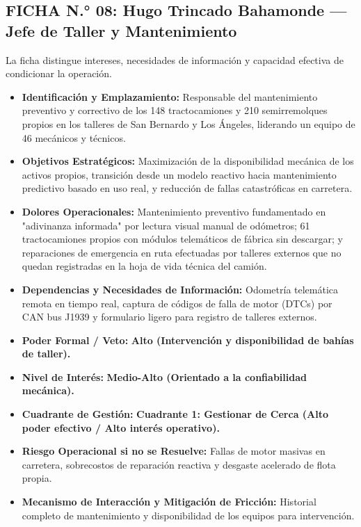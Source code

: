 \subsection*{FICHA N.° 08: Hugo Trincado Bahamonde — Jefe de Taller y Mantenimiento}
La ficha distingue intereses, necesidades de información y capacidad efectiva de condicionar la operación.
\begin{itemize}
\item \textbf{Identificación y Emplazamiento:} Responsable del mantenimiento preventivo y correctivo de los 148 tractocamiones y 210 semirremolques propios en los talleres de San Bernardo y Los Ángeles, liderando un equipo de 46 mecánicos y técnicos.
\item \textbf{Objetivos Estratégicos:} Maximización de la disponibilidad mecánica de los activos propios, transición desde un modelo reactivo hacia mantenimiento predictivo basado en uso real, y reducción de fallas catastróficas en carretera.
\item \textbf{Dolores Operacionales:} Mantenimiento preventivo fundamentado en "adivinanza informada" por lectura visual manual de odómetros; 61 tractocamiones propios con módulos telemáticos de fábrica sin descargar; y reparaciones de emergencia en ruta efectuadas por talleres externos que no quedan registradas en la hoja de vida técnica del camión.
\item \textbf{Dependencias y Necesidades de Información:} Odometría telemática remota en tiempo real, captura de códigos de falla de motor (DTCs) por CAN bus J1939 y formulario ligero para registro de talleres externos.
\item \textbf{Poder Formal / Veto:} \textbf{Alto (Intervención y disponibilidad de bahías de taller).}
\item \textbf{Nivel de Interés:} \textbf{Medio-Alto (Orientado a la confiabilidad mecánica).}
\item \textbf{Cuadrante de Gestión:} \textbf{Cuadrante 1: Gestionar de Cerca (Alto poder efectivo / Alto interés operativo).}
\item \textbf{Riesgo Operacional si no se Resuelve:} Fallas de motor masivas en carretera, sobrecostos de reparación reactiva y desgaste acelerado de flota propia.
\item \textbf{Mecanismo de Interacción y Mitigación de Fricción:} Historial completo de mantenimiento y disponibilidad de los equipos para intervención.
\end{itemize}
